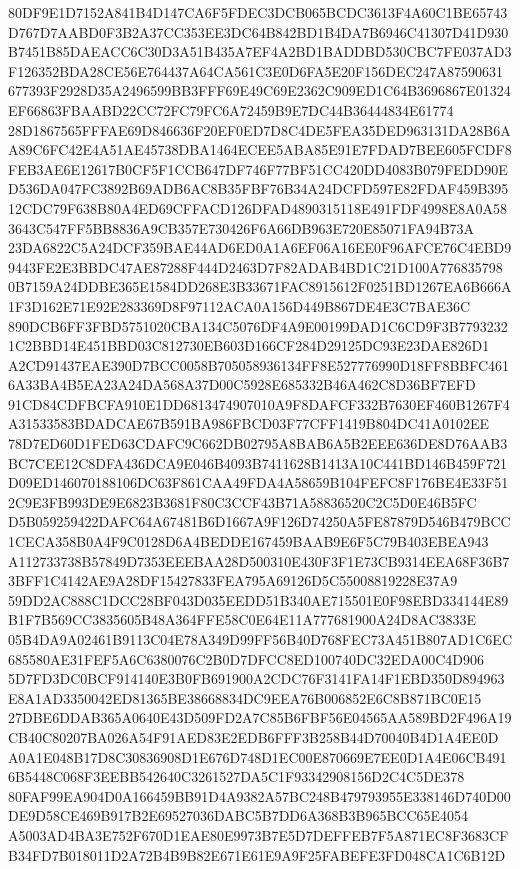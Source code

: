 \documentclass[UTF8,fontset=fandol,zihao=-4,a4paper]{ctexart}
\begin{document}
{{80DF9E1D7152A841B4D147CA6F5FDEC3DCB065BCDC3613F4A60C1BE65743D767D7AABD0F3B2A37CC353EE3DC64B842BD1B4DA7B6946C41307D41D930
B7451B85DAEACC6C30D3A51B435A7EF4A2BD1BADDBD530CBC7FE037AD3F126352BDA28CE56E764437A64CA561C3E0D6FA5E20F156DEC247A87590631
677393F2928D35A2496599BB3FFF69E49C69E2362C909ED1C64B3696867E01324EF66863FBAABD22CC72FC79FC6A72459B9E7DC44B36444834E61774
28D1867565FFFAE69D846636F20EF0ED7D8C4DE5FEA35DED963131DA28B6AA89C6FC42E4A51AE45738DBA1464ECEE5ABA85E91E7FDAD7BEE605FCDF8
FEB3AE6E12617B0CF5F1CCB647DF746F77BF51CC420DD4083B079FEDD90ED536DA047FC3892B69ADB6AC8B35FBF76B34A24DCFD597E82FDAF459B395
12CDC79F638B80A4ED69CFFACD126DFAD4890315118E491FDF4998E8A0A583643C547FF5BB8836A9CB357E730426F6A66DB963E720E85071FA94B73A
23DA6822C5A24DCF359BAE44AD6ED0A1A6EF06A16EE0F96AFCE76C4EBD99443FE2E3BBDC47AE87288F444D2463D7F82ADAB4BD1C21D100A776835798
0B7159A24DDBE365E1584DD268E3B33671FAC8915612F0251BD1267EA6B666A1F3D162E71E92E283369D8F97112ACA0A156D449B867DE4E3C7BAE36C
890DCB6FF3FBD5751020CBA134C5076DF4A9E00199DAD1C6CD9F3B77932321C2BBD14E451BBD03C812730EB603D166CF284D29125DC93E23DAE826D1
A2CD91437EAE390D7BCC0058B705058936134FF8E527776990D18FF8BBFC4616A33BA4B5EA23A24DA568A37D00C5928E685332B46A462C8D36BF7EFD
91CD84CDFBCFA910E1DD6813474907010A9F8DAFCF332B7630EF460B1267F4A31533583BDADCAE67B591BA986FBCD03F77CFF1419B804DC41A0102EE
78D7ED60D1FED63CDAFC9C662DB02795A8BAB6A5B2EEE636DE8D76AAB3BC7CEE12C8DFA436DCA9E046B4093B7411628B1413A10C441BD146B459F721
D09ED146070188106DC63F861CAA49FDA4A58659B104FEFC8F176BE4E33F512C9E3FB993DE9E6823B3681F80C3CCF43B71A58836520C2C5D0E46B5FC
D5B059259422DAFC64A67481B6D1667A9F126D74250A5FE87879D546B479BCC1CECA358B0A4F9C0128D6A4BEDDE167459BAAB9E6F5C79B403EBEA943
A112733738B57849D7353EEEBAA28D500310E430F3F1E73CB9314EEA68F36B73BFF1C4142AE9A28DF15427833FEA795A69126D5C55008819228E37A9
59DD2AC888C1DCC28BF043D035EEDD51B340AE715501E0F98EBD334144E89B1F7B569CC3835605B48A364FFE58C0E64E11A777681900A24D8AC3833E
05B4DA9A02461B9113C04E78A349D99FF56B40D768FEC73A451B807AD1C6EC685580AE31FEF5A6C6380076C2B0D7DFCC8ED100740DC32EDA00C4D906
5D7FD3DC0BCF914140E3B0FB691900A2CDC76F3141FA14F1EBD350D894963E8A1AD3350042ED81365BE38668834DC9EEA76B006852E6C8B871BC0E15
27DBE6DDAB365A0640E43D509FD2A7C85B6FBF56E04565AA589BD2F496A19CB40C80207BA026A54F91AED83E2EDB6FFF3B258B44D70040B4D1A4EE0D
A0A1E048B17D8C30836908D1E676D748D1EC00E870669E7EE0D1A4E06CB4916B5448C068F3EEBB542640C3261527DA5C1F93342908156D2C4C5DE378
80FAF99EA904D0A166459BB91D4A9382A57BC248B479793955E338146D740D00DE9D58CE469B917B2E69527036DABC5B7DD6A368B3B965BCC65E4054
A5003AD4BA3E752F670D1EAE80E9973B7E5D7DEFFEB7F5A871EC8F3683CFB34FD7B018011D2A72B4B9B82E671E61E9A9F25FABEFE3FD048CA1C6B12D
}}
\end{document}
